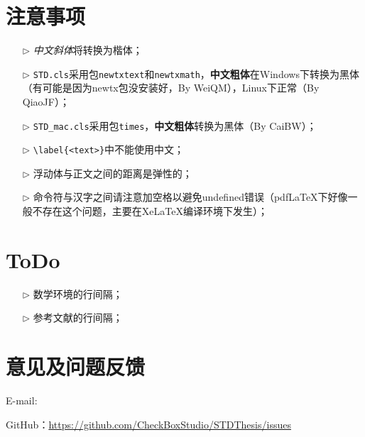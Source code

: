 \section{注意事项}
\begin{itemize}
  \item[$\triangleright$] \textit{中文斜体}将转换为楷体；
  \item[$\triangleright$] \verb|STD.cls|采用包{\tt newtxtext}和{\tt newtxmath}，\textbf{中文粗体}在Windows下转换为黑体（有可能是因为newtx包没安装好，By WeiQM），Linux下正常（By QiaoJF）；
  \item[$\triangleright$] \verb|STD_mac.cls|采用包{\tt times}，\textbf{中文粗体}转换为黑体（By CaiBW）；
  \item[$\triangleright$] \verb|\label{<text>}|中不能使用中文；
  \item[$\triangleright$] 浮动体与正文之间的距离是弹性的；
  \item[$\triangleright$] 命令符与汉字之间请注意加空格以避免undefined错误（pdfLaTeX下好像一般不存在这个问题，主要在XeLaTeX编译环境下发生）；
\end{itemize}

\section{ToDo}
\begin{itemize}
  \item[$\triangleright$] 数学环境的行间隔；
  \item[$\triangleright$] 参考文献的行间隔；
\end{itemize}

\section{意见及问题反馈}

\indent E-mail:

\indent GitHub：\href{https://github.com/CheckBoxStudio/STDThesis/issues}{https://github.com/CheckBoxStudio/STDThesis/issues}
